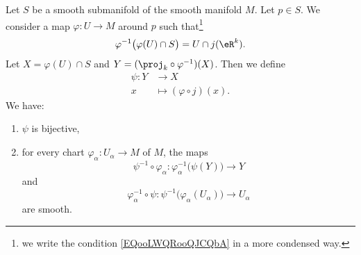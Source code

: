 \begin{proposition}
    Let \( S\) be a smooth submanifold of the smooth manifold \( M\). Let \( p\in S\). We consider a map \( \varphi\colon U\to M\) around \( p\) such that\footnote{we write the condition \ref{EQooLWQRooQJCQbA} in a more condensed way.}
    \begin{equation}
        \varphi^{-1}\big( \varphi(U)\cap S \big)=U\cap j(\eR^k).
    \end{equation}
    Let \( X=\varphi(U)\cap S\) and \( Y=(\proj_k\circ\varphi^{-1})(X)\). Then we define
    \begin{equation}
        \begin{aligned}
            \psi\colon Y&\to X \\
            x&\mapsto (\varphi\circ j)(x). 
        \end{aligned}
    \end{equation}
    We have:
    \begin{enumerate}
        \item
            \( \psi\) is bijective,
        \item
            for every chart \( \varphi_{\alpha}\colon U_{\alpha}\to M\) of \( M\), the maps
            \begin{equation}        \label{EQooBAGFooDnpctJ}
                    \psi^{-1}\circ\varphi_{\alpha}\colon \varphi_{\alpha}^{-1}\big( \psi(Y) \big)\to Y
            \end{equation}
            and
            \begin{equation}        \label{EQooKQIUooDCCczD}
                \varphi_{\alpha}^{-1}\circ\psi\colon \psi^{-1}\big( \varphi_{\alpha}(U_{\alpha}) \big)\to U_{\alpha}
            \end{equation}
            are smooth.
    \end{enumerate}
\end{proposition}

